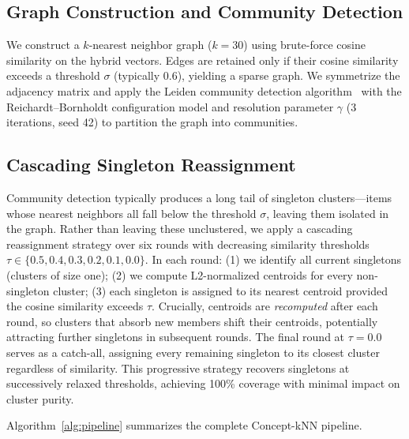 \documentclass[conference]{IEEEtran}
\begin{document}
\subsection{Graph Construction and Community Detection}

We construct a $k$-nearest neighbor graph ($k\!=\!30$) using brute-force cosine similarity on the hybrid vectors. Edges are retained only if their cosine similarity exceeds a threshold $\sigma$ (typically 0.6), yielding a sparse graph. We symmetrize the adjacency matrix and apply the Leiden community detection algorithm~\cite{traag2019leiden} with the Reichardt--Bornholdt configuration model and resolution parameter $\gamma$ (3 iterations, seed 42) to partition the graph into communities.

\subsection{Cascading Singleton Reassignment}

Community detection typically produces a long tail of singleton clusters---items whose nearest neighbors all fall below the threshold $\sigma$, leaving them isolated in the graph. Rather than leaving these unclustered, we apply a cascading reassignment strategy over six rounds with decreasing similarity thresholds $\tau \in \{0.5, 0.4, 0.3, 0.2, 0.1, 0.0\}$. In each round: (1) we identify all current singletons (clusters of size one); (2) we compute L2-normalized centroids for every non-singleton cluster; (3) each singleton is assigned to its nearest centroid provided the cosine similarity exceeds $\tau$. Crucially, centroids are \emph{recomputed} after each round, so clusters that absorb new members shift their centroids, potentially attracting further singletons in subsequent rounds. The final round at $\tau\!=\!0.0$ serves as a catch-all, assigning every remaining singleton to its closest cluster regardless of similarity. This progressive strategy recovers singletons at successively relaxed thresholds, achieving 100\% coverage with minimal impact on cluster purity.

Algorithm~\ref{alg:pipeline} summarizes the complete Concept-kNN pipeline.
\end{document}
